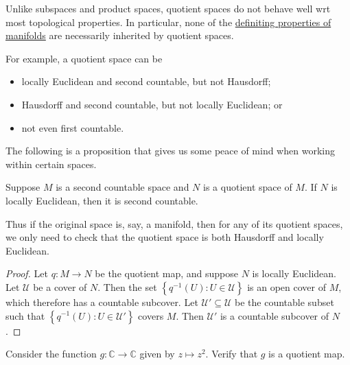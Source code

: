 \documentclass[notoc,notitlepage]{tufte-book}
\begin{document}
\begin{warning}
  Unlike subspaces and product spaces, quotient spaces do not behave well wrt most topological
  properties. In particular, none of the \hyperref[defn:manifold]{definiting properties of
  manifolds} are necessarily inherited by quotient spaces.

  For example, a quotient space can be 
  \begin{itemize}
    \item locally Euclidean and second countable, but not Hausdorff;
    \item Hausdorff and second countable, but not locally Euclidean; or
    \item not even first countable.
  \end{itemize}
\end{warning}

The following is a proposition that gives us some peace of mind when working within certain
spaces.

\begin{propo}\label{propo:locally_euclidean_quotient_space_of_a_second_countable_space_is_second_countable}
  Suppose $M$ is a second countable space and $N$ is a quotient space of $M$. If $N$ is
  locally Euclidean, then it is second countable.
\end{propo}

\begin{note}
  Thus if the original space is, say, a manifold, then for any of its quotient spaces, we only
  need to check that the quotient space is both Hausdorff and locally Euclidean.
\end{note}

\begin{proof}
  Let $q : M \to N$ be the quotient map, and suppose $N$ is locally Euclidean. Let $\mathcal{U}$
  be a cover of $N$. Then the set $\left\{ q^{-1}(U) : U \in \mathcal{U} \right\}$ is an open
  cover of $M$, which therefore has a countable subcover. Let $\mathcal{U}' \subseteq \mathcal{U}$
  be the countable subset such that $\left\{ q^{-1}(U) : U \in \mathcal{U}' \right\}$ covers $M$.
  Then $\mathcal{U}'$ is a countable subcover of $N$.
\end{proof}

\begin{ex}
  Consider the function $g : \mathbb{C} \to \mathbb{C}$ given by $z \mapsto z^2$. Verify that
  $g$ is a quotient map.
\end{ex}
\end{document}
